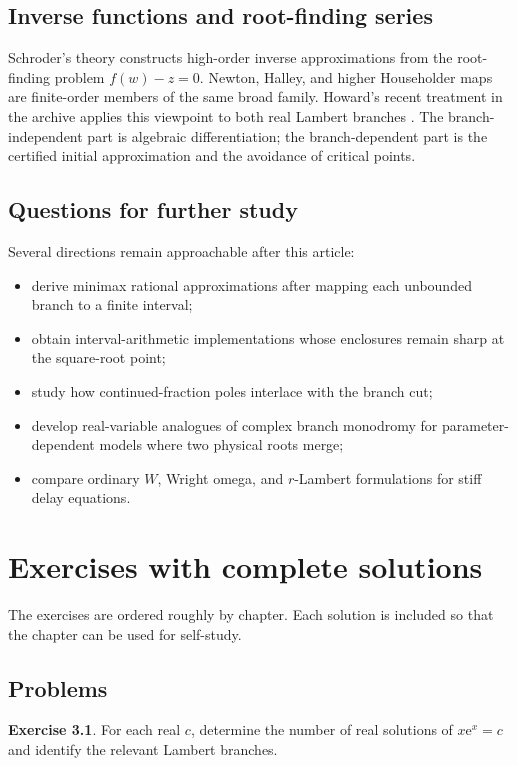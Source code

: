 \documentclass[11pt,oneside]{book}
\theoremstyle{definition}
\newtheorem{exercise}[theorem]{Exercise}
\theoremstyle{remark}
\newcommand{\ee}{\mathrm e}
\begin{document}
\section{Inverse functions and root-finding series}

Schroder's theory constructs high-order inverse approximations from the
root-finding problem $f(w)-z=0$.  Newton, Halley, and higher Householder maps
are finite-order members of the same broad family.  Howard's recent treatment
in the archive applies this viewpoint to both real Lambert branches
\cite{howard2025}.  The branch-independent part is algebraic differentiation;
the branch-dependent part is the certified initial approximation and the
avoidance of critical points.

\section{Questions for further study}

Several directions remain approachable after this article:
\begin{itemize}
\item derive minimax rational approximations after mapping each unbounded
branch to a finite interval;
\item obtain interval-arithmetic implementations whose enclosures remain
sharp at the square-root point;
\item study how continued-fraction poles interlace with the branch cut;
\item develop real-variable analogues of complex branch monodromy for
parameter-dependent models where two physical roots merge;
\item compare ordinary $W$, Wright omega, and $r$-Lambert formulations for
stiff delay equations.
\end{itemize}


\chapter{Exercises with complete solutions}\label{ch:exercises}

The exercises are ordered roughly by chapter.  Each solution is included so
that the chapter can be used for self-study.

\section{Problems}

\begin{exercise}\label{ex:rootcount}
For each real $c$, determine the number of real solutions of
$x\ee^x=c$ and identify the relevant Lambert branches.
\end{exercise}
\end{document}
